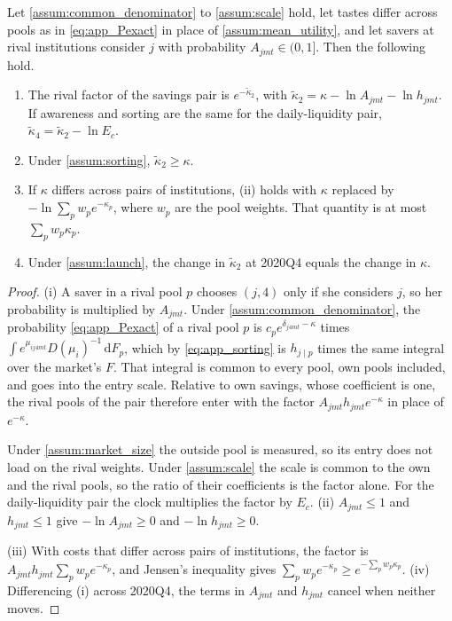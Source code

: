 \begin{prop}\label{prop:app_bound}
	Let \ref{assum:common_denominator} to \ref{assum:scale} hold, let tastes differ across pools as in \eqref{eq:app_Pexact} in place of \ref{assum:mean_utility}, and let savers at rival institutions consider $j$ with probability $A_{jmt}\in(0,1]$. Then the following hold.
	\begin{enumerate}[label=(\roman*)]
		\item The rival factor of the savings pair is $e^{-\tilde{\kappa}_2}$, with $\tilde{\kappa}_2=\kappa-\ln A_{jmt}-\ln h_{jmt}$. If awareness and sorting are the same for the daily-liquidity pair, $\tilde{\kappa}_4=\tilde{\kappa}_2-\ln E_c$.
		\item Under \ref{assum:sorting}, $\tilde{\kappa}_2\geq\kappa$.
		\item If $\kappa$ differs across pairs of institutions, (ii) holds with $\kappa$ replaced by $-\ln\sum_p w_pe^{-\kappa_p}$, where $w_p$ are the pool weights. That quantity is at most $\sum_p w_p\kappa_p$.
		\item Under \ref{assum:launch}, the change in $\tilde{\kappa}_2$ at 2020Q4 equals the change in $\kappa$.
	\end{enumerate}
\end{prop}

\begin{proof}
	(i) A saver in a rival pool $p$ chooses $(j,4)$ only if she considers $j$, so her probability is multiplied by $A_{jmt}$. Under \ref{assum:common_denominator}, the probability \eqref{eq:app_Pexact} of a rival pool $p$ is $c_pe^{\delta_{j4mt}-\kappa}$ times $\int e^{\mu_{ij4mt}}D(\mu_i)^{-1}\,\text{d}F_p$, which by \eqref{eq:app_sorting} is $h_{j\mid p}$ times the same integral over the market's $F$. That integral is common to every pool, own pools included, and goes into the entry scale. Relative to own savings, whose coefficient is one, the rival pools of the pair therefore enter with the factor $A_{jmt}h_{jmt}e^{-\kappa}$ in place of $e^{-\kappa}$.

	Under \ref{assum:market_size} the outside pool is measured, so its entry does not load on the rival weights. Under \ref{assum:scale} the scale is common to the own and the rival pools, so the ratio of their coefficients is the factor alone. For the daily-liquidity pair the clock multiplies the factor by $E_c$. (ii) $A_{jmt}\leq1$ and $h_{jmt}\leq1$ give $-\ln A_{jmt}\geq0$ and $-\ln h_{jmt}\geq0$.

	(iii) With costs that differ across pairs of institutions, the factor is $A_{jmt}h_{jmt}\sum_pw_pe^{-\kappa_p}$, and Jensen's inequality gives $\sum_pw_pe^{-\kappa_p}\geq e^{-\sum_pw_p\kappa_p}$. (iv) Differencing (i) across 2020Q4, the terms in $A_{jmt}$ and $h_{jmt}$ cancel when neither moves.
\end{proof}

